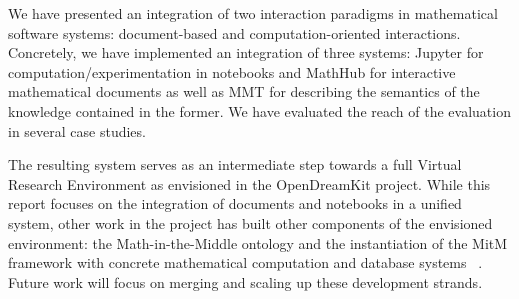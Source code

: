 We have presented an integration of two interaction paradigms in mathematical software systems: document-based and computation-oriented interactions. Concretely, we have implemented an integration of three systems:
Jupyter for computation/experimentation in notebooks and MathHub for interactive mathematical documents as well as MMT for describing the semantics of the knowledge contained in the former.
We have evaluated the reach of the evaluation in several case studies.

The resulting system serves as an intermediate step towards a full Virtual Research Environment as envisioned in the OpenDreamKit project. While this report focuses on the integration of documents and notebooks in a unified system, other work in the project has built other components of the envisioned environment: the Math-in-the-Middle ontology \cite{KohMuePfe:kbimss17} and the instantiation of the MitM framework with concrete mathematical computation and database systems ~\cite{WieKohRab:vtuimkb17}.
Future work will focus on merging and scaling up these development strands.


